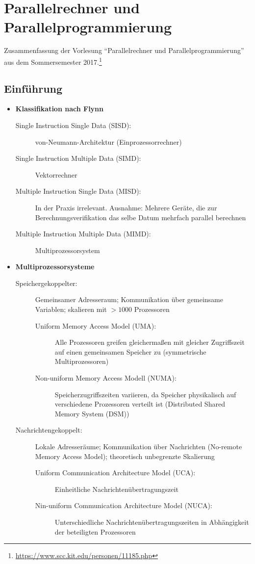 \chapter{Parallelrechner und Parallelprogrammierung}

Zusammenfassung der Vorlesung "`Parallelrechner und Parallelprogrammierung"' aus dem Sommersemester 2017.\footnote{\url{https://www.scc.kit.edu/personen/11185.php}}

\section{Einführung}

\begin{itemize}
	\item \textbf{Klassifikation nach Flynn}
	\begin{description}
		\item[Single Instruction Single Data (SISD):] von-Neumann-Architektur (Einprozessorrechner)
		\item[Single Instruction Multiple Data (SIMD):] Vektorrechner
		\item[Multiple Instruction Single Data (MISD):] In der Praxis irrelevant. Ausnahme: Mehrere Geräte, die zur Berechnungsverifikation das selbe Datum mehrfach parallel berechnen
		\item[Multiple Instruction Multiple Data (MIMD):] Multiprozessorsystem
	\end{description}
	\item \textbf{Multiprozessorsysteme}
	\begin{description}
		\item[Speichergekoppelter:] Gemeinsamer Adresseraum; Kommunikation über gemeinsame Variablen; skalieren mit \(>1000\) Prozessoren
		\begin{description}
			\item[Uniform Memory Access Model (UMA):] Alle Prozessoren greifen gleichermaßen mit gleicher Zugriffszeit auf einen gemeinsamen Speicher zu (symmetrische Multiprozessoren)
			\item[Non-uniform Memory Access Modell (NUMA):] Speicherzugriffszeiten variieren, da Speicher physikalisch auf verschiedene Prozessoren verteilt ist (Distributed Shared Memory System (DSM))
		\end{description}
		\item[Nachrichtengekoppelt:] Lokale Adresseräume; Kommunikation über Nachrichten (No-remote Memory Access Model); theoretisch unbegrenzte Skalierung
		\begin{description}
			\item[Uniform Communication Architecture Model (UCA):] Einheitliche Nachrichtenübertragungszeit
			\item[Nin-uniform Communication Architecture Model (NUCA):] Unterschiedliche Nachrichtenübertragungszeiten in Abhängigkeit der beteiligten Prozessoren
		\end{description}
	\end{description}
\end{itemize}